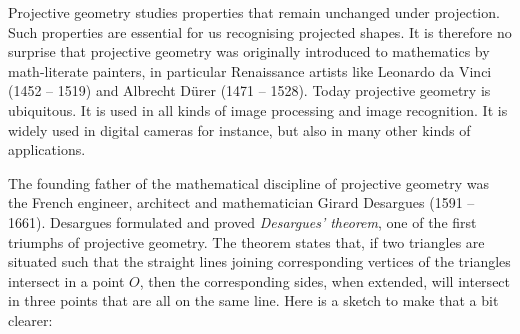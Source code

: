 \documentclass[tikz]{scrreprt}
\begin{document}
Projective geometry studies properties that remain
unchanged under projection. Such properties are essential
for us recognising projected shapes. It is therefore
no surprise that projective geometry was originally
introduced to mathematics by math-literate painters,
in particular Renaissance artists 
like Leonardo da Vinci (1452 -- 1519) and
Albrecht Dürer (1471 -- 1528). 
Today projective geometry is ubiquitous. It is used
in all kinds of image processing and image recognition.
It is widely used in digital cameras for instance,
but also in many other kinds of applications.

The founding father of the mathematical discipline
of projective geometry was the French 
engineer, architect and mathematician 
Girard Desargues (1591 -- 1661). Desargues formulated
and proved \emph{Desargues' theorem}, one of the first
triumphs of projective geometry. The theorem states that,
if two triangles are situated such that the straight lines
joining corresponding vertices of the triangles intersect
in a point $O$, then the corresponding sides, when
extended, will intersect in three points that are all
on the same line. Here is a sketch to make that
a bit clearer:

\begin{center}
\end{center}
\end{document}
